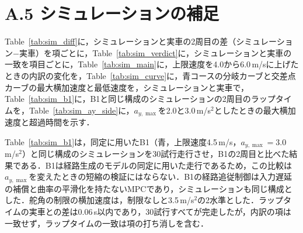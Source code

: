 \section*{A.5 シミュレーションの補足}
\label{sec:app_sim_extra}
Table~\ref{tab:sim_diff}に，シミュレーションと実車の2周目の差（シミュレーション$-$実車）を項ごとに，Table~\ref{tab:sim_verdict}に，シミュレーションと実車の一致を項目ごとに，Table~\ref{tab:sim_main}に，上限速度を4.0から6.0\,m/sに上げたときの内訳の変化を，Table~\ref{tab:sim_curve}に，青コースの分岐カーブと交差点カーブの最大横加速度と最低速度を，シミュレーションと実車で，Table~\ref{tab:sim_b1}に，B1と同じ構成のシミュレーションの2周目のラップタイムを，Table~\ref{tab:sim_ay_side}に，$a_{y,\max}$を2.0と3.0\,m/s$^2$としたときの最大横加速度と超過時間を示す．

Table~\ref{tab:sim_b1}は，同定に用いたB1（青，上限速度4.5\,m/s，$a_{y,\max}=3.0$\,m/s$^2$）と同じ構成のシミュレーションを30試行走行させ，B1の2周目と比べた結果である．B1は経路生成のモデルの同定に用いた走行であるため，この比較は$a_{y,\max}$を変えたときの短縮の検証にはならない．B1の経路追従制御は入力遅延の補償と曲率の平滑化を持たないMPCであり，シミュレーションも同じ構成とした．舵角の制限の横加速度は，制限なしと3.5\,m/s$^2$の2水準とした．ラップタイムの実車との差は0.06\,s以内であり，30試行すべてが完走したが，内訳の項は一致せず，ラップタイムの一致は項の打ち消しを含む．

